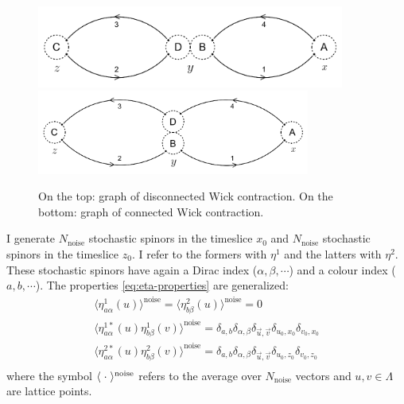 \documentclass[11pt,a4paper]{article}
\begin{document}
\begin{figure}[h!]
    \centering
    \includegraphics[width=0.9\textwidth]{include-imgs/Wick_disconnected.png}
    \includegraphics[width=0.8\textwidth]{include-imgs/Wick_connected.png}
    \caption{On the top: graph of disconnected Wick contraction. On the bottom: graph of connected Wick contraction.}
\end{figure}\label{figura_fig}
\newline
I generate $N_{\text{noise}}$ stochastic spinors in the timeslice $x_0$ and $N_{\text{noise}}$ stochastic spinors in the timeslice $z_0$.
I refer to the formers with $\eta^{1}$ and the latters with $\eta^{2}$.
These stochastic spinors have again a Dirac index ($\alpha,\beta,\cdots$) and a colour index ($a,b,\cdots$).
The properties \ref{eq:eta-properties} are generalized:
\begin{equation}
    \begin{gathered}
        \langle \eta^{1}_{a\alpha} (u) \rangle^{\text{noise}} = \langle \eta^{2}_{b\beta} (u) \rangle^{\text{noise}} = 0 \\
        \langle \eta^{1*}_{a\alpha} (u) \eta^{1}_{b\beta} (v) \rangle^{\text{noise}} = \delta_{a,b} \delta_{\alpha,\beta} \delta_{\vec u, \vec v} \delta_{u_0,x_0} \delta_{v_0,x_0} \\
        \langle \eta^{2*}_{a\alpha} (u) \eta^{2}_{b\beta} (v) \rangle^{\text{noise}} = \delta_{a,b} \delta_{\alpha,\beta} \delta_{\vec u, \vec v} \delta_{u_0,z_0} \delta_{v_0,z_0} \\
    \end{gathered}
\end{equation}
where the symbol $\langle\hspace{1mm}\cdot\hspace{1mm}\rangle^\text{noise}$ refers to the average over $N_{\text{noise}}$ vectors and $u,v \in \Lambda$ are lattice points.
\end{document}

